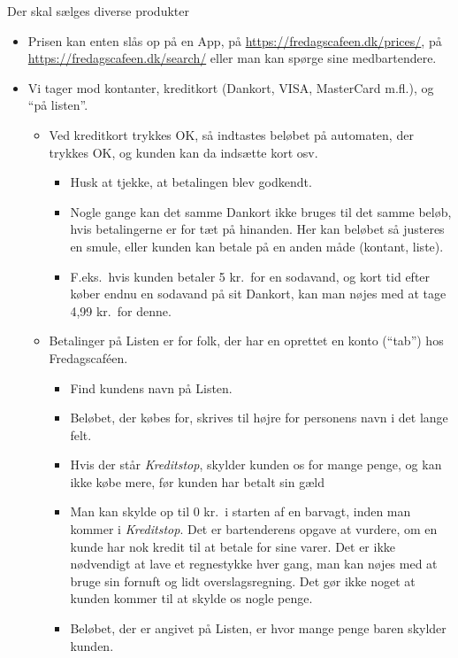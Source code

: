 Der skal sælges diverse produkter
\begin{itemize}
\item Prisen kan enten slås op på en App, på
  \url{https://fredagscafeen.dk/prices/}, på \url{https://fredagscafeen.dk/search/} eller man kan spørge
  sine medbartendere.
\item Vi tager mod kontanter, kreditkort (Dankort, VISA, MasterCard
  m.fl.), og ``på listen''.
  \begin{itemize}
  \item Ved kreditkort trykkes OK, så indtastes beløbet på automaten, der
    trykkes OK, og kunden kan da indsætte kort osv.
    \begin{itemize}
    \item Husk at tjekke, at betalingen blev godkendt.
    \item Nogle gange kan det samme Dankort ikke bruges til det samme
      beløb, hvis betalingerne er for tæt på hinanden. Her kan beløbet
      så justeres en smule, eller kunden kan betale på en anden måde
      (kontant, liste).
    \item F.eks.\ hvis kunden betaler 5 kr.\ for en sodavand, og kort
      tid efter køber endnu en sodavand på sit Dankort, kan man nøjes
      med at tage 4,99 kr.\ for denne.
    \end{itemize}
  \item Betalinger på Listen er for folk, der har en oprettet en konto
    (``tab'') hos Fredagscaféen.
    \begin{itemize}
    \item Find kundens navn på Listen.
    \item Beløbet, der købes for, skrives til højre for personens navn
      i det lange felt.
    \item Hvis der står \emph{Kreditstop}, skylder kunden os for mange
      penge, og kan ikke købe mere, før kunden har betalt sin gæld
    \item Man kan skylde op til 0 kr.\ i starten af en barvagt, inden
      man kommer i \emph{Kreditstop}. Det er bartenderens opgave at vurdere,
      om en kunde har nok kredit til at betale for sine varer.
      Det er ikke nødvendigt at lave et regnestykke hver gang, man kan nøjes
      med at bruge sin fornuft og lidt overslagsregning.
      Det gør ikke noget at kunden kommer til at skylde os nogle penge.
    \item Beløbet, der er angivet på Listen, er hvor mange penge baren skylder kunden.

\end{itemize}
\end{itemize}
\end{itemize}

